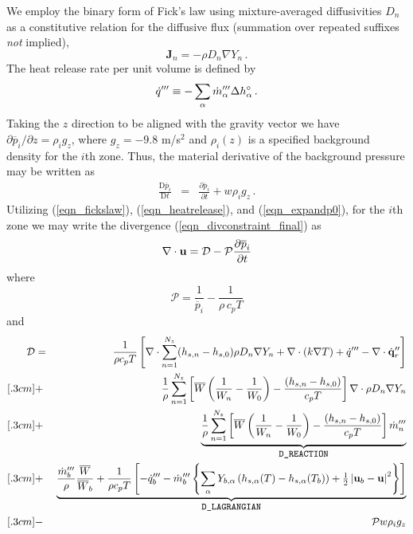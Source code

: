 \noindent We employ the binary form of Fick's law using mixture-averaged diffusivities $D_n$ as a constitutive relation for the diffusive flux (summation over repeated suffixes \emph{not} implied),
\begin{equation}
\label{eqn_fickslaw}
\mathbf{J}_n = - \rho D_n \nabla Y_n \,\mbox{.}
\end{equation}
The heat release rate per unit volume is defined by
\begin{equation}
\label{eqn_heatrelease}
\dot{q}^{\prime\prime\prime} \equiv -\sum_\alpha \dot{m}_{\alpha}^{\prime\prime\prime} \Delta h^\circ_\alpha \,\mbox{.}
\end{equation}
Taking the $z$ direction to be aligned with the gravity vector we have $\partial \overline{p}_i/\partial z = \rho_i g_z$,
where $g_z = -9.8$ m/s$^2$ and $\rho_i(z)$ is a specified background density for the $i$th zone.
Thus, the material derivative of the background pressure may be written as
\begin{eqnarray}
\label{eqn_expandp0}
\frac{\mbox{D}\overline{p}_i}{\mbox{D}t} &=& \frac{\partial \overline{p}_i}{\partial t} + w \rho_i g_z \,\mbox{.}
\end{eqnarray}
Utilizing (\ref{eqn_fickslaw}), (\ref{eqn_heatrelease}), and (\ref{eqn_expandp0}), for the $i$th zone we may write the divergence (\ref{eqn_divconstraint_final}) as
\begin{equation}
\label{eqn_fds_divcontraint}
\nabla\cdot \mathbf{u} = \mathcal{D} - \mathcal{P} \frac{\partial \overline{p}_i}{\partial t}
\end{equation}
where
\begin{equation}
\label{eqn_fdsP}
\mathcal{P} =  \frac{1}{\overline{p}_i}-\frac{1}{\rho \,c_p T}
\end{equation}
and
\begin{eqnarray}
\label{eqn_fdsD}
\mathcal{D} &=& \frac{1}{\rho c_p T} \left[ \nabla\cdot \sum_{n=1}^{N_z} (h_{s,n}-h_{s,0}) \rho D_n \nabla Y_n +  \nabla\cdot(k \nabla T)  + \dot{q}^{\prime\prime\prime} - \nabla\cdot\dot{\mathbf{q}}^{\prime\prime}_{r} \right] \nonumber\\ [.3cm]
&+& \frac{1}{\rho}\sum_{n=1}^{N_z} \left[\overline{W}\left(\frac{1}{W_n} - \frac{1}{W_0}\right) - \frac{(h_{s,n}-h_{s,0})}{c_p T} \right] \nabla\cdot \rho D_n \nabla Y_n \nonumber\\ [.3cm]
&+& \underbrace{\frac{1}{\rho}\sum_{n=1}^{N_z} \left[\overline{W}\left(\frac{1}{W_n} - \frac{1}{W_0}\right) - \frac{(h_{s,n}-h_{s,0})}{c_p T} \right] \dot{m}_n^{\prime\prime\prime}}_{\mbox{\tt\small D\_REACTION}} \nonumber\\ [.3cm]
&+& \underbrace{\frac{\dot{m}_b^{\prime\prime\prime}}{\rho}\frac{\overline{W}}{\overline{W}_b} + \frac{1}{\rho c_p T} \left[ - \dot{q}_b^{\prime\prime\prime} -\dot{m}_{b}^{{\prime\prime\prime}} \left\{\sum_\alpha Y_{b,\alpha} \left( h_{s,\alpha}(T)-h_{s,\alpha}(T_b)\right) + \mbox{$\frac{1}{2}$}\left|\mathbf{u}_b-\mathbf{u}\right|^2 \right\}  \right]}_{\mbox{\tt\small D\_LAGRANGIAN}} \nonumber\\ [.3cm]
&-& \mathcal{P} w \rho_i g_z
\end{eqnarray}
\vspace{0.3cm}

